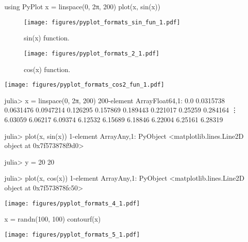




\begin{juliacode}
using PyPlot
x = linspace(0, 2π, 200)
plot(x, sin(x))
\end{juliacode}
\begin{figure}[ht]
\center
\texttt{[image: figures/pyplot\_formats\_sin\_fun\_1.pdf]}
\caption{sin(x) function.}
\label{fig:sin_fun}
\end{figure}



\begin{figure}[htpb]
\center
\texttt{[image: figures/pyplot\_formats\_2\_1.pdf]}
\caption{cos(x) function.}
\end{figure}



\texttt{[image: figures/pyplot\_formats\_cos2\_fun\_1.pdf]}



\begin{juliaterm}
julia> x = linspace(0, 2π, 200)
200-element Array{Float64,1}:
 0.0      
 0.0315738
 0.0631476
 0.0947214
 0.126295 
 0.157869 
 0.189443 
 0.221017 
 0.25259  
 0.284164 
 ⋮        
 6.03059  
 6.06217  
 6.09374  
 6.12532  
 6.15689  
 6.18846  
 6.22004  
 6.25161  
 6.28319  

julia> plot(x, sin(x))
1-element Array{Any,1}:
 PyObject <matplotlib.lines.Line2D object at 0x7f573878f9d0>

julia> y = 20
20

julia> plot(x, cos(x))
1-element Array{Any,1}:
 PyObject <matplotlib.lines.Line2D object at 0x7f573878fc50>

\end{juliaterm}
\texttt{[image: figures/pyplot\_formats\_4\_1.pdf]}



\begin{juliacode}
x = randn(100, 100)
contourf(x)
\end{juliacode}
\texttt{[image: figures/pyplot\_formats\_5\_1.pdf]}

